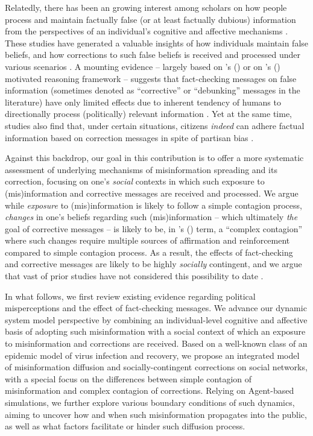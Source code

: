 \documentclass[man, 12pt, a4paper]{apa6}
\begin{document}
Relatedly, there has been an growing interest among scholars on how people process and maintain factually false (or at least factually dubious) information from the perspectives of an individual's cognitive and affective mechanisms \parencite{LEWANDOWSKY_JARMC2017, garrett2016driving, weeks2015emotions}. These studies have generated a valuable insights of how individuals maintain false beliefs, and how corrections to such false beliefs is received and processed under various scenarios \parencite{LEWANDOWSKY_JARMC2017, thorson_2016}. A mounting evidence -- largely based on \citeauthor{kunda1990}'s (\citeyear{kunda1990}) or on \citeauthor{taber2006}'s (\citeyear{taber2006}) motivated reasoning framework -- suggests that fact-checking messages on false information (sometimes denoted as \enquote{corrective} or \enquote{debunking} messages in the literature) have only limited effects due to inherent tendency of humans to directionally process (politically) relevant information \parencite{thorson_2016, nyhan2010corrections, taber2006}. Yet at the same time, studies also find that, under certain situations, citizens \emph{indeed} can adhere factual information based on correction messages in spite of partisan bias \parencite[e.g.,][]{Wood2018, Garrett_Weeks_2013, weeks2015emotions}. 

Against this backdrop, our goal in this contribution is to offer a more systematic assessment of underlying mechanisms of misinformation spreading and its correction, focusing on one's \emph{social} contexts in which such exposure to (mis)information and corrective messages are received and processed. We argue while \emph{exposure} to (mis)information is likely to follow a simple contagion process, \emph{changes} in one's beliefs regarding such (mis)information -- which ultimately \emph{the} goal of corrective messages -- is likely to be, in \citeauthor{centola2007complex}'s (\citeyear{centola2007complex}) term, a \enquote{complex contagion} where such changes require multiple sources of affirmation and reinforcement compared to simple contagion process. As a result, the effects of fact-checking and corrective messages are likely to be highly \emph{socially} contingent, and we argue that vast of prior studies have not considered this possibility to date \parencite[for a notable exception, see][]{margolin2017}.    

In what follows, we first review existing evidence regarding political misperceptions and the effect of fact-checking messages. We advance our dynamic system model perspective by combining an individual-level cognitive and affective basis of adopting such misinformation with a social context of which an exposure to misinformation and corrections are received. Based on a well-known class of an epidemic model of virus infection and recovery, we propose an integrated model of misinformation diffusion and socially-contingent corrections on social networks, with a special focus on the differences between simple contagion of misinformation and complex contagion of corrections. Relying on Agent-based simulations, we further explore various boundary conditions of such dynamics, aiming to uncover how and when such misinformation propagates into the public, as well as what factors facilitate or hinder such diffusion process.
\end{document}
